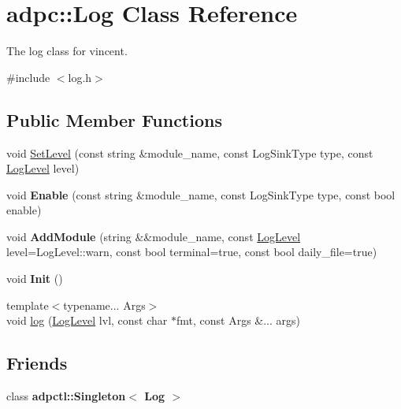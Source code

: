 \hypertarget{classadpc_1_1Log}{}\section{adpc\+:\+:Log Class Reference}
\label{classadpc_1_1Log}


The log class for vincent.  




{\ttfamily \#include $<$log.\+h$>$}

\subsection*{Public Member Functions}
\begin{DoxyCompactItemize}
\item 
void \hyperlink{classadpc_1_1Log_a2e8bf1e2c8ac8381be9022df60530f87}{Set\+Level} (const string \&module\+\_\+name, const Log\+Sink\+Type type, const \hyperlink{log__config_8h_a172986fa5f658c5fe0b42bd954e9e133}{Log\+Level} level)
\item 
\mbox{\label{classadpc_1_1Log_ae9c832f1a8d5f684308f5ef95d53cf36}} 
void {\bfseries Enable} (const string \&module\+\_\+name, const Log\+Sink\+Type type, const bool enable)
\item 
\mbox{\label{classadpc_1_1Log_a599ccdccf8a85ae3779a8f587424cea8}} 
void {\bfseries Add\+Module} (string \&\&module\+\_\+name, const \hyperlink{log__config_8h_a172986fa5f658c5fe0b42bd954e9e133}{Log\+Level} level=Log\+Level\+::warn, const bool terminal=true, const bool daily\+\_\+file=true)
\item 
\mbox{\label{classadpc_1_1Log_ab1def13d51364c2b804b3a143eb71bf9}} 
void {\bfseries Init} ()
\end{DoxyCompactItemize}
\textbf{ }\par
\begin{DoxyCompactItemize}
\item 
{\footnotesize template$<$typename... Args$>$ }\\void \hyperlink{classadpc_1_1Log_ae3e21b4038776f15d0b5ebdfebc41f57}{log} (\hyperlink{log__config_8h_a172986fa5f658c5fe0b42bd954e9e133}{Log\+Level} lvl, const char $\ast$fmt, const Args \&... args)
\end{DoxyCompactItemize}

\subsection*{Friends}
\begin{DoxyCompactItemize}
\item 
\mbox{\label{classadpc_1_1Log_a0e7b4c16064e3789d935b1b3523d78c7}} 
class {\bfseries adpctl\+::\+Singleton$<$ Log $>$}
\end{DoxyCompactItemize}


